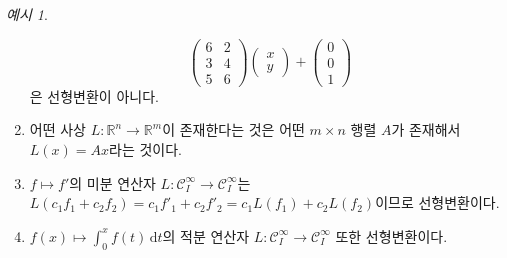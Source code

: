 \documentclass[unfonts,oneside,a4paper]{oblivoir}
\theoremstyle{definition}
\theoremstyle{theorem}
\theoremstyle{theorem}
\theoremstyle{remark}
\theoremstyle{remark}
\theoremstyle{remark}
\newtheorem*{example}{예시}
\theoremstyle{remark}
\renewcommand{\vec}[1]{\bm{\mathit{#1}}}
\newcommand{\dd}{\mathrm{d}}
\begin{document}
\begin{example}
\begin{enumerate}
\begin{equation*}
\begin{pmatrix}
                    6 & 2 \\ 3 & 4 \\ 5 & 6
                    \end{pmatrix} \begin{pmatrix}
                    x \\ y
                    \end{pmatrix} + \begin{pmatrix}
                    0 \\ 0 \\ 1
                \end{pmatrix}
            \end{equation*}
            은 선형변환이 아니다.
        \item 어떤 사상 $L: \mathbb R^n \rightarrow \mathbb R^m$이 존재한다는 것은 어떤 $m \times n$ 행렬 $A$가 존재해서 $L(\vec x) = A \vec x$라는 것이다.
        \item $f \mapsto f'$의 미분 연산자 $L: \mathcal C^\infty_I \rightarrow \mathcal C^\infty_I$는 $L(c_1 f_1 + c_2 f_2) = c_1 f'_1 + c_2 f'_2 = c_1 L(f_1) + c_2 L(f_2)$이므로 선형변환이다.
        \item $f(x) \mapsto \int_0^x f(t)\, \dd t$의 적분 연산자 $L: \mathcal C^\infty_I \rightarrow \mathcal C^\infty_I$ 또한 선형변환이다.
    \end{enumerate}
\end{example}
\end{document}
